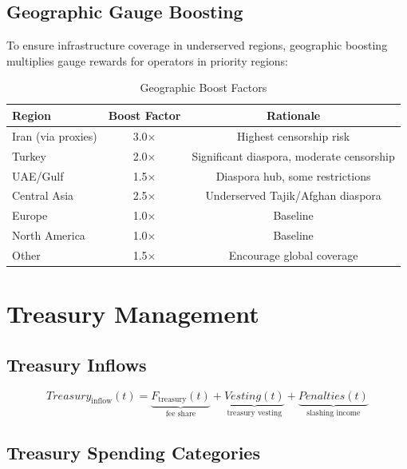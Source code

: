 \documentclass[11pt,a4paper]{article}
\begin{document}
\subsection{Geographic Gauge Boosting}

To ensure infrastructure coverage in underserved regions, geographic boosting multiplies gauge rewards for operators in priority regions:

\begin{table}[H]
\centering
\caption{Geographic Boost Factors}
\label{tab:geo-boost}
\begin{tabular}{lcc}
\toprule
\textbf{Region} & \textbf{Boost Factor} & \textbf{Rationale} \\
\midrule
Iran (via proxies) & 3.0$\times$ & Highest censorship risk \\
Turkey & 2.0$\times$ & Significant diaspora, moderate censorship \\
UAE/Gulf & 1.5$\times$ & Diaspora hub, some restrictions \\
Central Asia & 2.5$\times$ & Underserved Tajik/Afghan diaspora \\
Europe & 1.0$\times$ & Baseline \\
North America & 1.0$\times$ & Baseline \\
Other & 1.5$\times$ & Encourage global coverage \\
\bottomrule
\end{tabular}
\end{table}

\section{Treasury Management}

\subsection{Treasury Inflows}

\begin{equation}
    \mathit{Treasury}_{\text{inflow}}(t) = \underbrace{F_{\text{treasury}}(t)}_{\text{fee share}} + \underbrace{\mathit{Vesting}(t)}_{\text{treasury vesting}} + \underbrace{\mathit{Penalties}(t)}_{\text{slashing income}}
\end{equation}

\subsection{Treasury Spending Categories}
\end{document}
